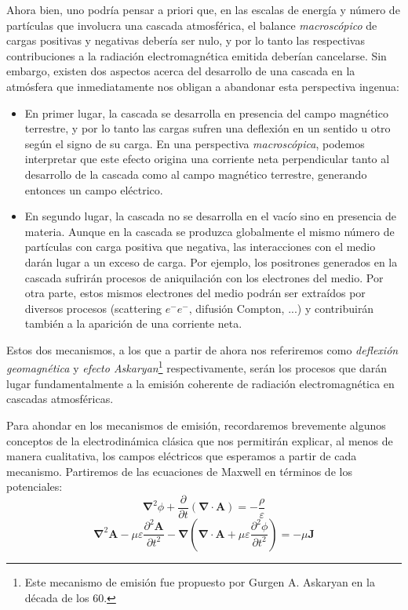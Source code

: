 \documentclass[12 pt, a4paper]{article} %
\numberwithin{equation}{section}
\numberwithin{figure}{section}
\numberwithin{table}{section}
\newcommand{\vect}[1]{\boldsymbol{\mathbf{#1}}}
\begin{document}
	Ahora bien, uno podría pensar a priori que, en las escalas de energía y número de partículas que involucra una cascada atmosférica, el balance \textit{macroscópico} de cargas positivas y negativas debería ser nulo, y por lo tanto las respectivas contribuciones a la radiación electromagnética emitida deberían cancelarse. Sin embargo, existen dos aspectos acerca del desarrollo de una cascada en la atmósfera que inmediatamente nos obligan a abandonar esta perspectiva ingenua:
	\begin{itemize}
		\item En primer lugar, la cascada se desarrolla en presencia del campo magnético terrestre, y por lo tanto las cargas sufren una deflexión en un sentido u otro según el signo de su carga. En una perspectiva \textit{macroscópica}, podemos interpretar que este efecto origina una corriente neta perpendicular tanto al desarrollo de la cascada como al campo magnético terrestre, generando entonces un campo eléctrico.
		\item En segundo lugar, la cascada no se desarrolla en el vacío sino en presencia de materia. Aunque en la cascada se produzca globalmente el mismo número de partículas con carga positiva que negativa, las interacciones con el medio darán lugar a un exceso de carga. Por ejemplo, los positrones generados en la cascada sufrirán procesos de aniquilación con los electrones del medio. Por otra parte, estos mismos electrones del medio podrán ser extraídos por diversos procesos (scattering $e^-e^-$, difusión Compton, ...) y contribuirán también a la aparición de una corriente neta. 
	\end{itemize}

Estos dos mecanismos, a los que a partir de ahora nos referiremos como \textit{deflexión geomagnética} y \textit{efecto Askaryan}\footnote{ Este mecanismo de emisión fue propuesto por Gurgen A. Askaryan en la década de los 60.} respectivamente, serán los procesos que darán lugar fundamentalmente a la emisión coherente de radiación electromagnética en cascadas atmosféricas.

Para ahondar en los mecanismos de emisión, recordaremos brevemente algunos conceptos de la electrodinámica clásica que nos permitirán explicar, al menos de manera cualitativa, los campos eléctricos que esperamos a partir de cada mecanismo. Partiremos de las ecuaciones de Maxwell en términos de los potenciales:
	\begin{equation}
	\vect{\nabla}^2\phi+\frac{\partial}{\partial t}\left(\vect{\nabla}\cdot\vect{A}\right)=-\frac{\rho}{\varepsilon}\label{ec31}
	\end{equation}
	\begin{equation}
	\vect{\nabla}^2\vect{A}-\mu\varepsilon\frac{\partial^2\vect{A}}{\partial t^2}-\vect{\nabla}\left(\vect{\nabla}\cdot\vect{A}+\mu\varepsilon\frac{\partial^2\phi}{\partial t^2}\right)=-\mu\vect{J}\label{ec32}
	\end{equation}
\end{document}
